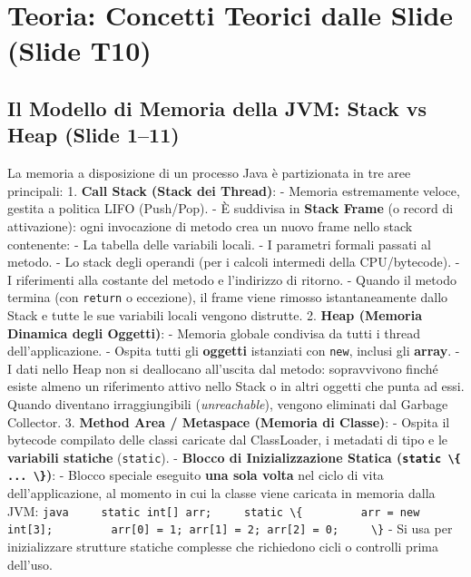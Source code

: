 \documentclass[11pt,a4paper,oneside]{report}
\newcommand{\passthrough}[1]{#1}
\begin{document}
\section{Teoria: Concetti Teorici dalle Slide (Slide
T10)}\label{chap09_teoria-concetti-teorici-dalle-slide-slide-t10}

\subsection{Il Modello di Memoria della JVM: Stack vs Heap (Slide
1--11)}\label{chap09_il-modello-di-memoria-della-jvm-stack-vs-heap-slide-111}

La memoria a disposizione di un processo Java è partizionata in tre aree
principali: 1. \textbf{Call Stack (Stack dei Thread)}: - Memoria
estremamente veloce, gestita a politica LIFO (Push/Pop). - È suddivisa
in \textbf{Stack Frame} (o record di attivazione): ogni invocazione di
metodo crea un nuovo frame nello stack contenente: - La tabella delle
variabili locali. - I parametri formali passati al metodo. - Lo stack
degli operandi (per i calcoli intermedi della CPU/bytecode). - I
riferimenti alla costante del metodo e l'indirizzo di ritorno. - Quando
il metodo termina (con \passthrough{\lstinline!return!} o eccezione), il
frame viene rimosso istantaneamente dallo Stack e tutte le sue variabili
locali vengono distrutte. 2. \textbf{Heap (Memoria Dinamica degli
Oggetti)}: - Memoria globale condivisa da tutti i thread
dell'applicazione. - Ospita tutti gli \textbf{oggetti} istanziati con
\passthrough{\lstinline!new!}, inclusi gli \textbf{array}. - I dati
nello Heap non si deallocano all'uscita dal metodo: sopravvivono finché
esiste almeno un riferimento attivo nello Stack o in altri oggetti che
punta ad essi. Quando diventano irraggiungibili (\emph{unreachable}),
vengono eliminati dal Garbage Collector. 3. \textbf{Method Area /
Metaspace (Memoria di Classe)}: - Ospita il bytecode compilato delle
classi caricate dal ClassLoader, i metadati di tipo e le
\textbf{variabili statiche} (\passthrough{\lstinline!static!}). -
\textbf{Blocco di Inizializzazione Statica
(\passthrough{\lstinline!static \{ ... \}!})}: - Blocco speciale
eseguito \textbf{una sola volta} nel ciclo di vita dell'applicazione, al
momento in cui la classe viene caricata in memoria dalla JVM:
\passthrough{\lstinline!java     static int[] arr;     static \{         arr = new int[3];         arr[0] = 1; arr[1] = 2; arr[2] = 0;     \}!}
- Si usa per inizializzare strutture statiche complesse che richiedono
cicli o controlli prima dell'uso.
\end{document}
